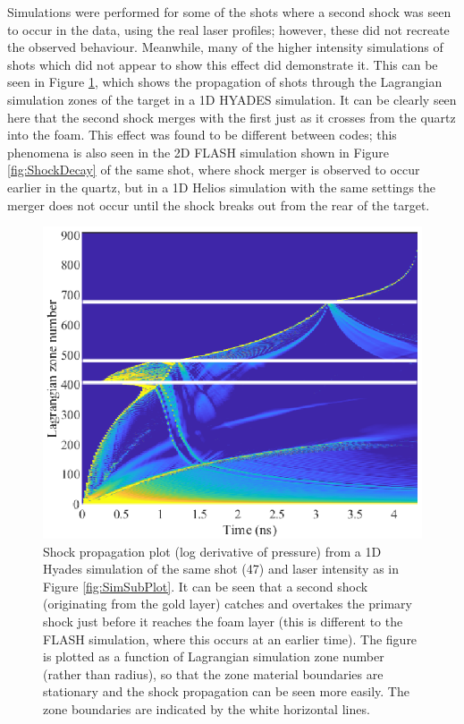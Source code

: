 Simulations were performed for some of the shots where a second shock was seen to occur in the data, using the real laser profiles; however, these did not recreate the observed behaviour. Meanwhile, many of the higher intensity simulations of shots which did not appear to show this effect did demonstrate it. This can be seen in Figure \ref{fig:ShockPlot}, which shows the propagation of shots through the Lagrangian simulation zones of the target in a 1D HYADES simulation. It can be clearly seen here that the second shock merges with the first just as it crosses from the quartz into the foam. This effect was found to be different between codes; this phenomena is also seen in the 2D FLASH simulation shown in Figure \ref{fig:ShockDecay} of the same shot, where shock merger is observed to occur earlier in the quartz, but in a 1D Helios simulation with the same settings the merger does not occur until the shock breaks out from the rear of the target.

\begin{figure}
\begin{centering}
\includegraphics{figures/Experiment/ShockPlot2.eps}%
\caption{\label{fig:ShockPlot} Shock propagation plot (log derivative of pressure) from a 1D Hyades simulation of the same shot (47) and laser intensity as in Figure \ref{fig:SimSubPlot}. It can be seen that a second shock (originating from the gold layer) catches and overtakes the primary shock just before it reaches the foam layer (this is different to the FLASH simulation, where this occurs at an earlier time). The figure is plotted as a function of Lagrangian simulation zone number (rather than radius), so that the zone material boundaries are stationary and the shock propagation can be seen more easily. The zone boundaries are indicated by the white horizontal lines.}
\end{centering}
\end{figure}

